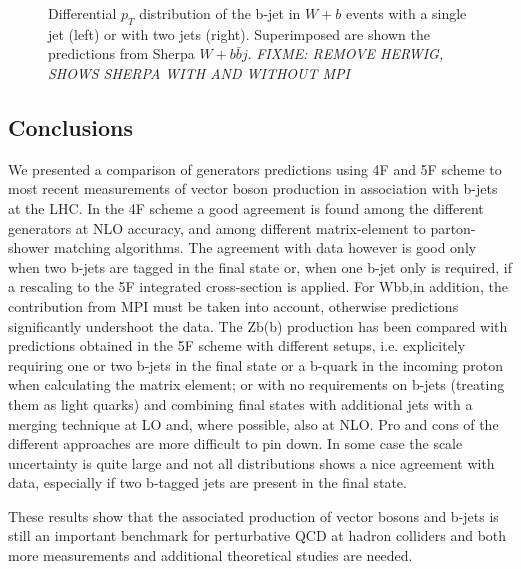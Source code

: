 \documentclass[11pt]{cernrep}
\newcommand{\pt}{\ensuremath{p_{T}}\xspace}
\begin{document}
\begin{figure}[htbp]
\begin{center}
\end{center}
\caption{Differential \pt distribution of the b-jet in $W+b$ events with a
  single jet (left) or with two jets (right). Superimposed are shown the
  predictions from Sherpa $W+b\bar{b}j$. {\em FIXME: REMOVE HERWIG,
    SHOWS SHERPA WITH AND WITHOUT MPI}}
\label{wbb-pt-sherpa}
\end{figure}

\subsection{Conclusions \label{concl}}

We presented a comparison of generators predictions using 4F and 5F scheme to most recent
measurements of vector boson production in association with b-jets at the LHC. In the 4F scheme a good agreement is found among the
different generators at NLO accuracy, and among different matrix-element to parton-shower matching algorithms. The
agreement with data however is good only when two b-jets are tagged in the final state or, when one b-jet only is
required, if a rescaling to the 5F integrated cross-section is applied. For Wbb,in addition, the contribution from MPI
must be taken into account, otherwise predictions significantly undershoot the data. The Zb(b) production has been
compared with predictions obtained in the 5F scheme with different setups, i.e. explicitely requiring one or two b-jets
in the final state or a b-quark in the incoming proton when calculating the matrix element; or with no requirements on
b-jets (treating them as light quarks) and combining final states with additional jets with a merging technique at LO
and, where possible, also at NLO. Pro and cons of the different approaches are more difficult to pin down. In some case
the scale uncertainty is quite large and not all distributions shows a nice agreement with data, especially if two
b-tagged jets are present in the final state.

These results show that the associated production of vector bosons and b-jets is still an important benchmark for
perturbative QCD at hadron colliders and both more measurements and additional theoretical studies are needed.


\end{document}
